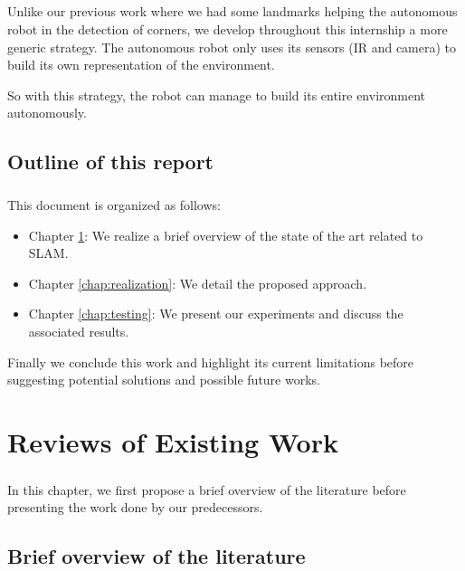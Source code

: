\documentclass[12pt]{report}
\begin{document}
	\paragraph{}
	Unlike our previous work where we had some landmarks helping the autonomous robot in the detection of corners, 
we develop throughout this internship a more generic strategy. The autonomous robot only uses its sensors (IR and camera) to build its own representation of the environment.
	
	So with this strategy, the robot can manage to build its entire environment autonomously.
	
	
	\section*{Outline of this report}
	\paragraph{}
	This document is organized as follows:
	\begin{itemize}
		\item Chapter \ref{chap:review}: We realize a brief overview of the state of the art related to SLAM.
		\item Chapter \ref{chap:realization}: We detail the proposed approach.
		\item Chapter \ref{chap:testing}: We present our experiments and discuss the associated results.

	\end{itemize}
	Finally we conclude this work and highlight its current limitations before suggesting potential solutions 
and possible future works.
	
	
    \chapter{Reviews of Existing Work}
    \label{chap:review}
	\paragraph{}
	In this chapter, we first propose a brief overview of the literature before presenting the work 
done by our predecessors.

\section{Brief overview of the literature}
\end{document}
